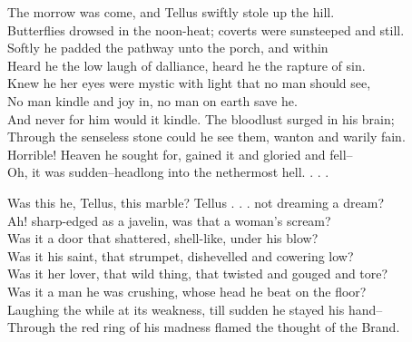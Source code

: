 \begin{poemblock}
The morrow was come, and Tellus swiftly stole up the hill.\\
Butterflies drowsed in the noon-heat; coverts were sunsteeped and still.\\
Softly he padded the pathway unto the porch, and within\\
Heard he the low laugh of dalliance, heard he the rapture of sin.\\
Knew he her eyes were mystic with light that no man should see,\\
No man kindle and joy in, no man on earth save he.\\
And never for him would it kindle.  The bloodlust surged in his brain;\\
Through the senseless stone could he see them, wanton and warily fain.\\
Horrible!  Heaven he sought for, gained it and gloried and fell--\\
Oh, it was sudden--headlong into the nethermost hell. . . .

Was this he, Tellus, this marble?  Tellus . . . not dreaming a dream?\\
Ah! sharp-edged as a javelin, was that a woman's scream?\\
Was it a door that shattered, shell-like, under his blow?\\
Was it his saint, that strumpet, dishevelled and cowering low?\\
Was it her lover, that wild thing, that twisted and gouged and tore?\\
Was it a man he was crushing, whose head he beat on the floor?\\
Laughing the while at its weakness, till sudden he stayed his hand--\\
Through the red ring of his madness flamed the thought of the Brand.


\end{poemblock}
